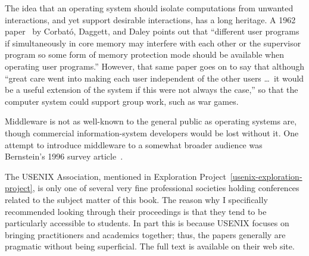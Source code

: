 The idea that an operating system should isolate computations from
unwanted interactions, and yet support desirable interactions, has a
long heritage.  A 1962 paper~\cite{max1169} by Corbat{\'o}, Daggett,
and Daley points out that ``different user programs if simultaneously
in core memory may interfere with each other or the supervisor program
so some form of memory protection mode should be available when
operating user programs.'' However, that same paper goes on to say
that although ``great care went into making each user independent of
the other users \ldots\ it would be a useful extension of the system if
this were not always the case,'' so that the computer system could
support group work, such as war games.

Middleware is not as well-known to the general public as operating
systems are, though commercial information-system developers would be
lost without it.  One attempt to introduce middleware to a somewhat
broader audience was Bernstein's 1996 survey article~\cite{max1016}.

The USENIX Association, mentioned in Exploration
Project~\ref{usenix-exploration-project}, is only one of several very
fine professional societies holding conferences related to the subject
matter of this book.  The reason why I specifically recommended looking through
their proceedings is that they tend to be particularly
accessible to students.  In part this is because USENIX focuses on
bringing practitioners and academics together; thus, the papers
generally are pragmatic without being superficial.
The full text is available on their web site.
